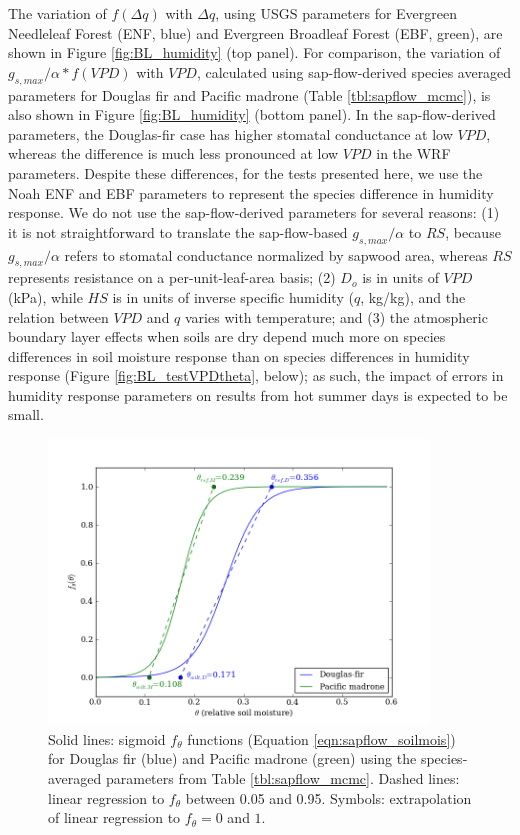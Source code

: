The variation of $f(\Delta q)$ with $\Delta q$, using USGS parameters for Evergreen Needleleaf Forest (ENF, blue) and Evergreen Broadleaf Forest (EBF, green), are shown in Figure \ref{fig:BL_humidity} (top panel).  For comparison, the variation of $g_{s, max}/\alpha * f(VPD)$ with $VPD$, calculated using sap-flow-derived species averaged parameters for Douglas fir and Pacific madrone (Table \ref{tbl:sapflow_mcmc}), is also shown in Figure \ref{fig:BL_humidity} (bottom panel).  In the sap-flow-derived parameters, the Douglas-fir case has higher stomatal conductance at low $VPD$, whereas the difference is much less pronounced at low $VPD$ in the WRF parameters.  Despite these differences, for the tests presented here, we use the Noah ENF and EBF parameters to represent the species difference in humidity response.  We do not use the sap-flow-derived parameters for several reasons: (1) it is not straightforward to translate the sap-flow-based $g_{s,max}/\alpha$ to $RS$, because $g_{s,max}/\alpha$ refers to stomatal conductance normalized by sapwood area, whereas $RS$ represents resistance on a per-unit-leaf-area basis; (2) $D_o$ is in units of $VPD$ (kPa), while $HS$ is in units of inverse specific humidity ($q$, kg/kg), and the relation between $VPD$ and $q$ varies with temperature; and (3) the atmospheric boundary layer effects when soils are dry depend much more on species differences in soil moisture response than on species differences in humidity response (Figure \ref{fig:BL_testVPDtheta}, below); as such, the impact of errors in humidity response parameters on results from hot summer days is expected to be small.

\begin{figure}[here]
\includegraphics[width=0.9\textwidth]{ch2-BL/figures/theta_params.png}
\caption{Solid lines: sigmoid $f_{\theta}$ functions (Equation \ref{eqn:sapflow_soilmois}) for Douglas fir (blue) and Pacific madrone (green) using the species-averaged parameters from Table \ref{tbl:sapflow_mcmc}.  Dashed lines: linear regression to $f_{\theta}$ between 0.05 and 0.95.  Symbols: extrapolation of linear regression to $f_{\theta}=0$ and $1$.}
\label{fig:BL_FeddesParams}
\end{figure}


